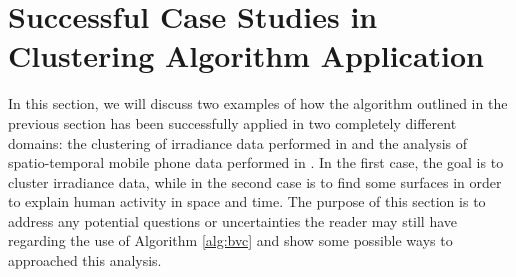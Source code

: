 \section{Successful Case Studies in Clustering Algorithm Application}
\label{sec:bcv-cases}
In this section, we will discuss two examples of how the algorithm outlined in the previous section has been successfully applied in two completely different domains: the clustering of irradiance data performed in \citeauthor{secchi_bagging_2013} \citeyear{secchi_bagging_2013} and the analysis of spatio-temporal mobile phone data performed in \citeauthor{secchi_analysis_2015} \citeyear{secchi_analysis_2015}. In the first case, the goal is to cluster irradiance data, while in the second case is to find some surfaces in order to explain human activity in space and time. The purpose of this section is to address any potential questions or uncertainties the reader may still have regarding the use of Algorithm \ref{alg:bvc} and show some possible ways to approached this analysis.
